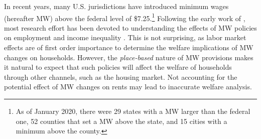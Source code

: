 
In recent years, many U.S. jurisdictions have introduced minimum wages (hereafter MW) above 
the federal level of \$7.25.\footnote{As of January 2020, there were 29 states with a MW 
	larger 	than the federal one, 52 counties that set a MW above the state, and 15 cities 
	with a minimum above the county.} 
Following the early work of \textcite{CardKrueger2000}, most research effort has been devoted 
to understanding the effects of MW policies on employment \parencite[e.g.,][]{Neumark2006, 
DubeEtAl2010, MeerWest2016, CegnizEtAl2019} and income inequality \parencite{Lee1999, 
AutorEtAl2016}. This is not surprising, as labor market effects are of first order importance 
to determine the welfare implications of MW changes on households. However, the 
\textit{place-based} nature of MW provisions makes it natural to expect that such policies 
will affect the welfare of households through other channels, such as the housing market.
Not accounting for the potential effect of MW changes on rents may lead to inaccurate 
welfare analysis.

